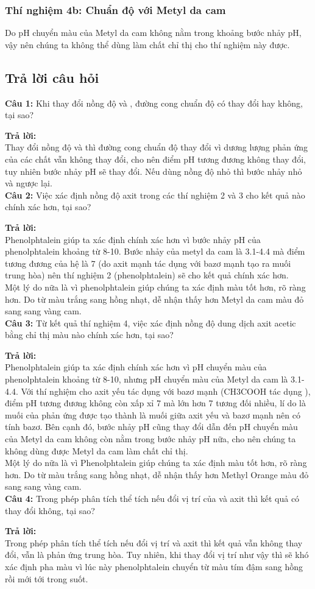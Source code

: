 \documentclass[12pt]{article}
\begin{document}
\subsubsection{Thí nghiệm 4b: Chuẩn độ  với Metyl da cam}
Do pH chuyển màu của Metyl da cam không nằm trong khoảng bước nhảy pH, vậy nên chúng ta không thể dùng làm chất chỉ thị cho thí nghiệm này được.
\subsection{Trả lời câu hỏi}
\textbf{Câu 1:} Khi thay đổi nồng độ  và , đường cong chuẩn độ có thay đổi hay không, tại sao? 

\textbf{Trả lời:} \\
Thay đổi nồng độ  và  thì đường cong chuẩn độ thay đổi vì dương lượng phản ứng của các chất vẫn không thay đổi, cho nên điểm pH tương đương không thay đổi, tuy nhiên bước nhảy pH sẽ thay đổi. Nếu dùng nồng độ nhỏ thì bước nhảy nhỏ và ngược lại.\\
\textbf{Câu 2:} Việc xác định nồng độ axit  trong các thí nghiệm 2 và 3 cho kết quả nào chính xác hơn, tại sao?

\textbf{Trả lời:} \\
Phenolphtalein giúp ta xác định chính xác hơn vì bước nhảy pH của phenolphtalein khoảng từ 8-10. Bước nhảy của metyl da cam là 3.1-4.4 mà điểm tương đương của hệ là 7 (do axit mạnh tác dụng với bazơ mạnh tạo ra muối trung hòa) nên thí nghiệm 2 (phenolphtalein) sẽ cho kết quả chính xác hơn. \\
Một lý do nữa là vì phenolphtalein giúp chúng ta xác định màu tốt hơn, rõ ràng hơn. Do từ màu trắng sang hồng nhạt, dễ nhận thấy hơn Metyl da cam màu đỏ sang sang vàng cam. \\
\textbf{Câu 3:} Từ kết quả thí nghiệm 4, việc xác định nồng độ dung dịch axit acetic bằng chỉ thị màu nào chính xác hơn, tại sao? 


\textbf{Trả lời:} \\
Phenolphtalein giúp ta xác định chính xác hơn vì pH chuyển màu của phenolphtalein khoảng từ 8-10, nhưng pH chuyển màu của Metyl da cam là 3.1-4.4. Với thí nghiệm cho axit yếu tác dụng với bazơ mạnh ({CH3COOH} tác dụng ), điểm pH tương đương không còn xấp xỉ 7 mà lớn hơn 7 tương đối nhiều, lí do là muối của phản ứng được tạo thành là muối giữa axit yếu và bazơ mạnh nên có tính bazơ. Bên cạnh đó, bước nhảy pH cũng thay đổi dẫn đến pH chuyển màu của Metyl da cam không còn nằm trong bước nhảy pH nữa, cho nên chúng ta không dùng được Metyl da cam làm chất chỉ thị.\\
Một lý do nữa là vì Phenolphtalein giúp chúng ta xác định màu tốt hơn, rõ ràng hơn. Do từ màu trắng sang hồng nhạt, dễ nhận thấy hơn Methyl Orange màu đỏ sang sang vàng cam.\\
\textbf{Câu 4:} Trong phép phân tích thể tích nếu đổi vị trí của  và axit thì kết quả có thay đổi không, tại sao? 


\textbf{Trả lời:} \\
Trong phép phân tích thể tích nếu đổi vị trí  và axit thì kết quả vẫn không thay đổi, vẫn là phản ứng trung hòa. Tuy nhiên, khi thay đổi vị trí như vậy thì sẽ khó xác định pha màu vì lúc này phenolphtalein chuyển từ màu tím đậm sang hồng rồi mới tới trong suốt.
\end{document}
